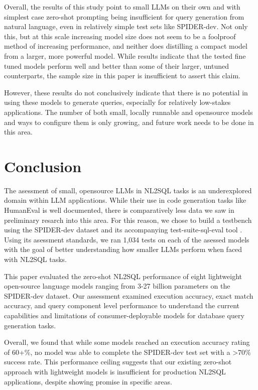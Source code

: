 \documentclass[sigconf]{acmart}
\begin{document}
Overall, the results of this study point to small LLMs on their own and with simplest case zero-shot prompting being 
insufficient for query generation from natural language, even in relatively simple test sets like SPIDER-dev. 
Not only this, but at this scale increasing model size does not seem to be a foolproof method of increasing performance,
and neither does distilling a compact model from a larger, more powerful model. While results indicate that the tested fine tuned
models perform well and better than some of their larger, untuned counterparts, the sample size in this paper is insufficient
to assert this claim. 

However, these results do not conclusively indicate that there is no potential in using these models to generate queries, especially for 
relatively low-stakes applications. The number of both small, locally runnable and opensource models and ways to configure
them is only growing, and future work needs to be done in this area. 

\section{Conclusion}

The asessment of small, opensource LLMs in NL2SQL tasks is an underexplored domain within LLM applications. While their
use in code generation tasks like HumanEval is well documented, there is comparatively less data we saw in preliminary
resarch into this area. For this reason, we chose to build a testbench using the SPIDER-dev dataset\cite{Yu&al.18c} and
its accompanying test-suite-sql-eval tool \cite{ruiqi20}. Using its asessment standards, we ran 1,034 tests on each of 
the asessed models with the goal of better understanding how smaller LLMs perform when faced with NL2SQL tasks.

This paper evaluated the zero-shot NL2SQL performance of eight lightweight open-source language models ranging from 3-27 
billion parameters on the SPIDER-dev dataset. Our assessment examined execution accuracy, exact match accuracy, and 
query component level performance to understand the current capabilities and limitations of consumer-deployable models for 
database query generation tasks.

Overall, we found that while some models reached an execution accuracy rating of 60+\%, no model was able to complete
the SPIDER-dev test set with a >70\% success rate. This performance ceiling suggests that our existing zero-shot approach
with lightweight models is insufficient for production NL2SQL applications, despite showing promise in specific areas.
\end{document}
